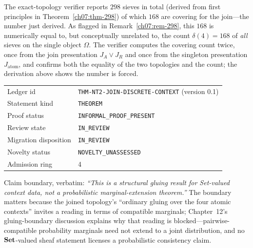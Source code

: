\begin{remark}\label{ch09:rem-168}
The exact-topology verifier reports $298$ sieves in total (derived from first principles in Theorem~\ref{ch07:thm-298}) of which $168$ are covering for the join---the number just derived. As flagged in Remark~\ref{ch07:rem-298}, this $168$ is numerically equal to, but conceptually unrelated to, the count $\delta(4)=168$ of \emph{all} sieves on the single object $\Omega$. The verifier computes the covering count twice, once from the join presentation $J_{A}\vee J_{R}$ and once from the singleton presentation $J_{\mathrm{atom}}$, and confirms both the equality of the two topologies and the count; the derivation above shows the number is forced.
\end{remark}

\begin{remark}\label{ch09:rem-ledger-nt24}
\begin{center}
\begin{tabular}{@{}ll@{}}
\toprule
Ledger id & \texttt{THM-NT2-JOIN-DISCRETE-CONTEXT} (version 0.1) \\
Statement kind & \texttt{THEOREM} \\
Proof status & \texttt{INFORMAL\_PROOF\_PRESENT} \\
Review state & \texttt{IN\_REVIEW} \\
Migration disposition & \texttt{IN\_REVIEW} \\
Novelty status & \texttt{NOVELTY\_UNASSESSED} \\
Admission ring & 4 \\
\bottomrule
\end{tabular}
\end{center}
Claim boundary, verbatim: \emph{``This is a structural gluing result for Set-valued context data, not a probabilistic marginal-extension theorem.''} The boundary matters because the joined topology's ``ordinary gluing over the four atomic contexts'' invites a reading in terms of compatible marginals; Chapter~12's gluing-boundary discussion explains why that reading is blocked---pairwise-compatible probability marginals need not extend to a joint distribution, and no $\mathbf{Set}$-valued sheaf statement licenses a probabilistic consistency claim.
\end{remark}

